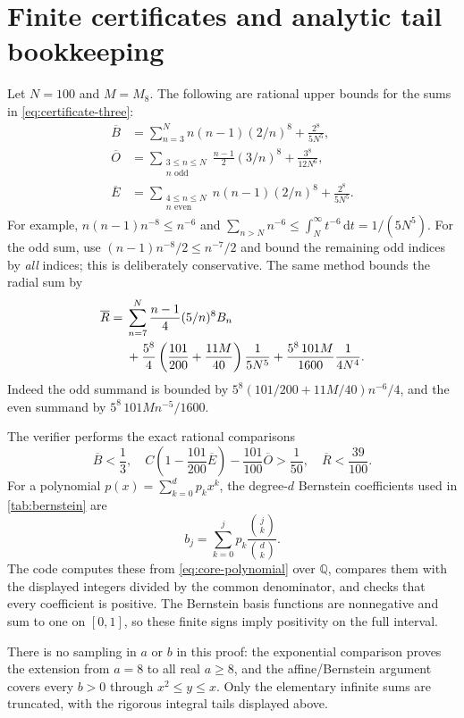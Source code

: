 \documentclass[11pt,letterpaper]{article}
\numberwithin{equation}{section}
\theoremstyle{definition}
\theoremstyle{remark}
\newcommand{\dd}{\,\mathrm d}
\begin{document}
\appendix
\section{Finite certificates and analytic tail bookkeeping}
\label{app:certificates}
Let $N=100$ and $M=M_8$. The following are rational upper bounds for
the sums in \eqref{eq:certificate-three}:
\begin{align*}
 \overline B&=\sum_{n=3}^{N}n(n-1)(2/n)^8
                 +\frac{2^8}{5N^5},\\
 \overline O&=\sum_{\substack{3\le n\le N\\n\text{ odd}}}
                    \frac{n-1}{2}(3/n)^8
                 +\frac{3^8}{12N^6},\\
 \overline E&=\sum_{\substack{4\le n\le N\\n\text{ even}}}
                    n(n-1)(2/n)^8
                 +\frac{2^8}{5N^5}.
\end{align*}
For example, $n(n-1)n^{-8}\le n^{-6}$ and
$\sum_{n>N}n^{-6}\le\int_N^\infty t^{-6}\dd t=1/(5N^5)$.
For the odd sum, use $(n-1)n^{-8}/2\le n^{-7}/2$ and bound the
remaining odd indices by \emph{all} indices; this is deliberately
conservative. The same method bounds the radial sum by
\begin{align}\label{eq:exact-tail-upper}
 \overline R={}&\sum_{n=7}^{N}\frac{n-1}{4}(5/n)^8 B_n\notag\\
 &+\frac{5^8}{4}\left(\frac{101}{200}+\frac{11M}{40}\right)
                  \frac1{5N^5}
 +\frac{5^8\,101M}{1600}\frac1{4N^4}.
\end{align}
Indeed the odd summand is bounded by
$5^8(101/200+11M/40)n^{-6}/4$, and the even summand by
$5^8\,101M n^{-5}/1600$.

The verifier performs the exact rational comparisons
\[
 \overline B<\frac13,\quad
 C\left(1-\frac{101}{200}\overline E\right)
       -\frac{101}{100}\overline O>\frac1{50},\quad
 \overline R<\frac{39}{100}.
\]
For a polynomial $p(x)=\sum_{k=0}^d p_kx^k$, the degree-$d$ Bernstein
coefficients used in \cref{tab:bernstein} are
\[
 b_j=\sum_{k=0}^j p_k\frac{\binom jk}{\binom dk}.
\]
The code computes these from \eqref{eq:core-polynomial} over
$\mathbb Q$, compares them with the displayed integers divided by
the common denominator, and checks that every coefficient is positive.
The Bernstein basis functions are nonnegative and sum to one on
$[0,1]$, so these finite signs imply positivity on the full interval.

There is no sampling in $a$ or $b$ in this proof: the exponential
comparison proves the extension from $a=8$ to all real $a\ge8$, and
the affine/Bernstein argument covers every $b>0$ through
$x^2\le y\le x$. Only the elementary infinite sums are truncated,
with the rigorous integral tails displayed above.
\end{document}
